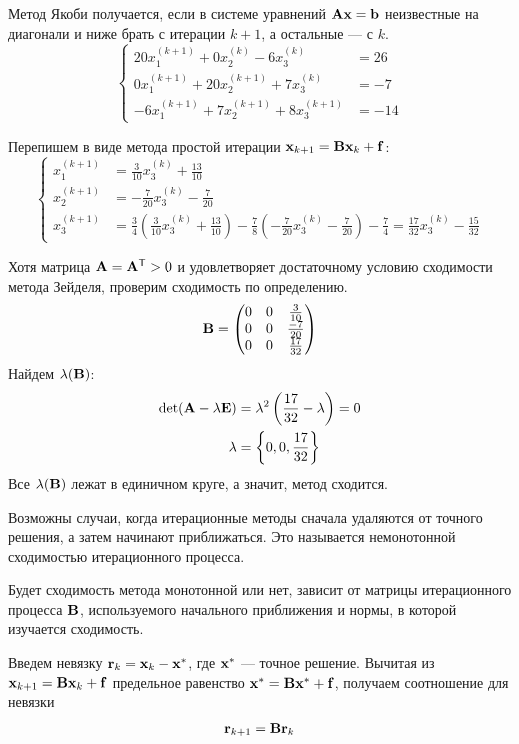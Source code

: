 \documentclass[professionalfonts,compress,unicode]{beamer}
\begin{document}
{
	Метод Якоби получается, если в системе уравнений ${\bf A}{\bf x} = {\bf b}$ 
	неизвестные на диагонали и ниже брать с итерации $k+1$, 
	а остальные --- с $k$.
	\begin{equation*}
	\begin{cases}
	20x_1^{(k+1)} + 0x_2^{(k)}  -6 x_3^{(k)} &= 26\\
	0x_1^{(k+1)} + 20x_2^{(k+1)} + 7x_3^{(k)}  &= -7\\
	-6x_1^{(k+1)} + 7x_2^{(k+1)} + 8x_3^{(k+1)} &= -14 
	\end{cases}
	\end{equation*}

	Перепишем в виде метода простой итерации ${\bf x}_{k+1} = {\bf B} {\bf x}_k + {\bf f}$:
	\begin{equation*}
	\begin{cases}
	x_1^{(k+1)} &= \frac{3}{10} x_3^{(k)} + \frac{13}{10}\\
	x_2^{(k+1)} &= -\frac{7}{20} x_3^{(k)} - \frac{7}{20}\\
	x_3^{(k+1)} &= \frac{3}{4} 
	\left(\frac{3}{10} x_3^{(k)} + \frac{13}{10}\right) 
	-\frac{7}{8} \left(-\frac{7}{20} x_3^{(k)} - \frac{7}{20}\right)-\frac{7}{4}
    = \frac{17}{32} x_3^{(k)} - \frac{15}{32}
	\end{cases}
	\end{equation*}
}

{
	Хотя матрица ${\bf A} = {\bf A}^\mathsf{T} > 0$ и удовлетворяет достаточному условию 
	сходимости метода Зейделя, проверим сходимость по определению.
    \begin{equation*}
    {\bf B} = \begin{pmatrix}
    0 & 0 & \frac{3}{10} \\
    0 & 0 & \frac{-7}{20} \\
    0 & 0 & \frac{17}{32}
    \end{pmatrix}
    \end{equation*}
    Найдем $\lambda({\bf B})$:
    \begin{align*}
    \operatorname{det} ({\bf A} - \lambda {\bf E}) &= 
    \lambda^2 \left(\frac{17}{32} - \lambda \right) = 0\\
    \lambda &= \left\{ 0, 0, \frac{17}{32}\right\}
    \end{align*}
    Все $\lambda({\bf B})$ лежат в единичном круге, а значит, метод сходится.
}

{
	Возможны случаи, когда итерационные методы сначала удаляются от точного решения, а затем
	начинают приближаться. Это называется немонотонной сходимостью итерационного процесса. 

	Будет сходимость метода монотонной или нет, зависит от матрицы итерационного процесса ${\bf B}$, 
	используемого начального приближения и нормы, в которой изучается сходимость.

    Введем невязку ${\bf r}_k = {\bf x}_k - {\bf x}^*$, где ${\bf x}^*$ --- точное решение. Вычитая
    из ${\bf x}_{k+1} = {\bf B} {\bf x}_k + {\bf f}$ предельное равенство ${\bf x}^* = {\bf B} {\bf x}^* + {\bf f}$,
    получаем соотношение для невязки
    \begin{equation*}
        {\bf r}_{k+1} = {\bf B} {\bf r}_k
    \end{equation*}
}
\end{document}
